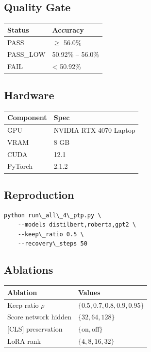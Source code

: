 \subsection{Quality Gate}

\begin{table}[H]
\centering
\small
\begin{tabular}{ll}
\toprule
\textbf{Status} & \textbf{Accuracy} \\
\midrule
PASS & $\ge$ 56.0\% \\
PASS\_LOW & 50.92\% -- 56.0\% \\
FAIL & \textless{} 50.92\% \\
\bottomrule
\end{tabular}
\end{table}

\subsection{Hardware}

\begin{table}[H]
\centering
\small
\begin{tabular}{ll}
\toprule
\textbf{Component} & \textbf{Spec} \\
\midrule
GPU & NVIDIA RTX 4070 Laptop \\
VRAM & 8 GB \\
CUDA & 12.1 \\
PyTorch & 2.1.2 \\
\bottomrule
\end{tabular}
\end{table}

\subsection{Reproduction}

\begin{lstlisting}
python run\_all\_4\_ptp.py \
    --models distilbert,roberta,gpt2 \
    --keep\_ratio 0.5 \
    --recovery\_steps 50
\end{lstlisting}

\subsection{Ablations}

\begin{table}[H]
\centering
\small
\begin{tabular}{ll}
\toprule
\textbf{Ablation} & \textbf{Values} \\
\midrule
Keep ratio $\rho$ & $\{0.5, 0.7, 0.8, 0.9, 0.95\}$ \\
Score network hidden & $\{32, 64, 128\}$ \\
 {[}CLS] preservation & $\{\text{on}, \text{off}\}$ \\
LoRA rank & $\{4, 8, 16, 32\}$ \\
\bottomrule
\end{tabular}
\end{table}

